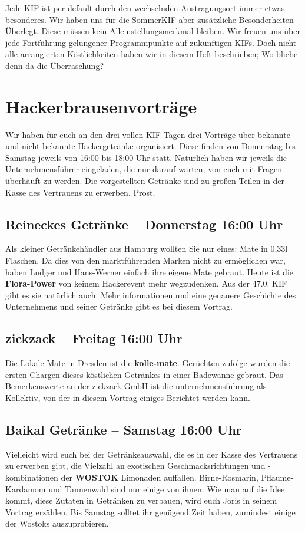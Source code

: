 
Jede KIF ist per default durch den wechselnden Austragungsort immer etwas besonderes. Wir haben uns
für die SommerKIF aber zusätzliche Besonderheiten Überlegt. Diese müssen kein Alleinstellungsmerkmal
bleiben. Wir freuen uns über jede Fortführung gelungener Programmpunkte auf zukünftigen KIFs. Doch
nicht alle arrangierten Köstlichkeiten haben wir in diesem Heft beschrieben; Wo bliebe denn da die
Überraschung?

\section*{Hackerbrausenvorträge}
Wir haben für euch an den drei vollen KIF-Tagen drei Vorträge über bekannte und nicht bekannte
Hackergetränke organisiert. Diese finden von Donnerstag bis Samstag jeweils von 16:00 bis 18:00 Uhr
statt. Natürlich haben wir jeweils die Unternehmensführer eingeladen, die nur darauf warten, von
euch mit Fragen überhäuft zu werden. Die vorgestellten Getränke sind zu großen Teilen in der Kasse
des Vertrauens zu erwerben. Prost.

\subsection*{Reineckes Getränke -- Donnerstag 16:00 Uhr}
Als kleiner Getränkehändler aus Hamburg wollten Sie nur eines: Mate in 0,33l Flaschen. Da dies von
den marktführenden Marken nicht zu ermöglichen war, haben Ludger und Hans-Werner einfach ihre eigene
Mate gebraut. Heute ist die \textbf{Flora-Power} von keinem Hackerevent mehr wegzudenken. Aus der
47.0. KIF gibt es sie natürlich auch. Mehr informationen und eine genauere Geschichte des
Unternehmens und seiner Getränke gibt es bei diesem Vortrag.

\subsection*{zickzack -- Freitag 16:00 Uhr}
Die Lokale Mate in Dresden ist die \textbf{kolle-mate}. Gerüchten zufolge wurden die ersten Chargen
dieses köstlichen Getränkes in einer Badewanne gebraut. Das Bemerkenswerte an der zickzack GmbH ist
die unternehmensführung als Kollektiv, von der in diesem Vortrag einiges Berichtet werden kann.

\subsection*{Baikal Getränke -- Samstag 16:00 Uhr}
Vielleicht wird euch bei der Getränkeauswahl, die es in der Kasse des Vertrauens zu erwerben gibt,
die Vielzahl an exotischen Geschmacksrichtungen und -kombinationen der \textbf{WOSTOK} Limonaden
auffallen. Birne-Rosmarin, Pflaume-Kardamom und Tannenwald sind nur einige von ihnen. Wie man auf
die Idee kommt, diese Zutaten in Getränken zu verbauen, wird euch Joris in seinem Vortrag erzählen.
Bis Samstag solltet ihr genügend Zeit haben, zumindest einige der Wostoks auszuprobieren.



